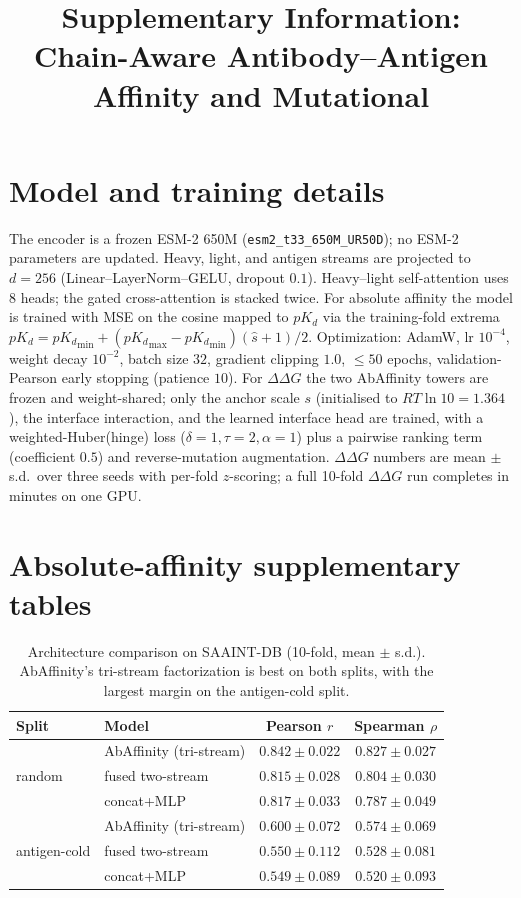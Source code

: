 \documentclass{article}
\title{\vspace{-2em}\bfseries Supplementary Information:\\ Chain-Aware Antibody--Antigen Affinity and Mutational \ddg{}}
\author{}\date{}
\newcommand{\ddg}{\ensuremath{\Delta\Delta G}}
\newcommand{\pkd}{\ensuremath{pK_d}}
\begin{document}
\maketitle\vspace{-2em}

\section{Model and training details}
The encoder is a frozen ESM-2 650M (\texttt{esm2\_t33\_650M\_UR50D}); no ESM-2 parameters are updated.
Heavy, light, and antigen streams are projected to $d{=}256$ (Linear--LayerNorm--GELU, dropout $0.1$).
Heavy--light self-attention uses $8$ heads; the gated cross-attention is stacked twice. For absolute
affinity the model is trained with MSE on the cosine mapped to \pkd{} via the training-fold extrema
$\pkd={\pkd}_{\min}+({\pkd}_{\max}-{\pkd}_{\min})(\hat s+1)/2$. Optimization: AdamW, lr $10^{-4}$, weight decay
$10^{-2}$, batch size $32$, gradient clipping $1.0$, $\leq 50$ epochs, validation-Pearson early stopping
(patience $10$). For \ddg{} the two AbAffinity towers are frozen and weight-shared; only the anchor scale
$s$ (initialised to $RT\ln 10=1.364$), the interface interaction, and the learned interface head are
trained, with a weighted-Huber(hinge) loss ($\delta{=}1,\tau{=}2,\alpha{=}1$) plus a pairwise ranking term
(coefficient $0.5$) and reverse-mutation augmentation. \ddg{} numbers are mean $\pm$ s.d.\ over three seeds
with per-fold $z$-scoring; a full 10-fold \ddg{} run completes in minutes on one GPU.

\section{Absolute-affinity supplementary tables}

\begin{table}[h]\centering
\caption{Architecture comparison on SAAINT-DB (10-fold, mean $\pm$ s.d.). AbAffinity's tri-stream
factorization is best on both splits, with the largest margin on the antigen-cold split.}
\begin{tabular}{llcc}
\toprule
Split & Model & Pearson $r$ & Spearman $\rho$\\
\midrule
\multirow{3}{*}{random}
 & AbAffinity (tri-stream) & $\mathbf{0.842\pm0.022}$ & $\mathbf{0.827\pm0.027}$\\
 & fused two-stream        & $0.815\pm0.028$ & $0.804\pm0.030$\\
 & concat+MLP              & $0.817\pm0.033$ & $0.787\pm0.049$\\
\midrule
\multirow{3}{*}{antigen-cold}
 & AbAffinity (tri-stream) & $\mathbf{0.600\pm0.072}$ & $\mathbf{0.574\pm0.069}$\\
 & fused two-stream        & $0.550\pm0.112$ & $0.528\pm0.081$\\
 & concat+MLP              & $0.549\pm0.089$ & $0.520\pm0.093$\\
\bottomrule
\end{tabular}
\end{table}
\end{document}
